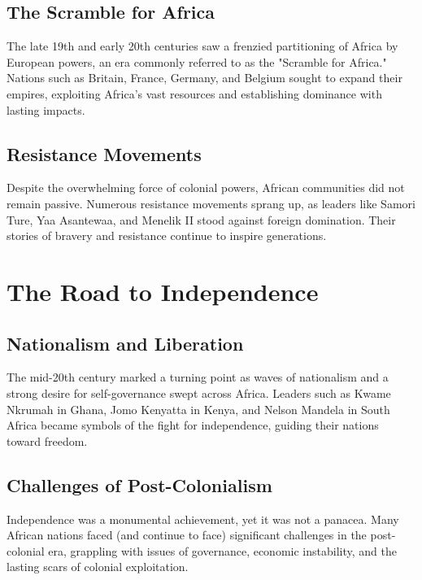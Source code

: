 \documentclass[a4paper,12pt]{book}
\begin{document}
\subsection{The Scramble for Africa}
\label{subsec:scramble-for-africa}

The late 19th and early 20th centuries saw a frenzied partitioning of Africa by European powers, an era commonly referred to as the "Scramble for Africa." Nations such as Britain, France, Germany, and Belgium sought to expand their empires, exploiting Africa’s vast resources and establishing dominance with lasting impacts.

\subsection{Resistance Movements}
\label{subsec:resistance-movements}

Despite the overwhelming force of colonial powers, African communities did not remain passive. Numerous resistance movements sprang up, as leaders like Samori Ture, Yaa Asantewaa, and Menelik II stood against foreign domination. Their stories of bravery and resistance continue to inspire generations.

\section{The Road to Independence}
\label{sec:road-to-independence}

\subsection{Nationalism and Liberation}
\label{subsec:nationalism-and-liberation}

The mid-20th century marked a turning point as waves of nationalism and a strong desire for self-governance swept across Africa. Leaders such as Kwame Nkrumah in Ghana, Jomo Kenyatta in Kenya, and Nelson Mandela in South Africa became symbols of the fight for independence, guiding their nations toward freedom.

\subsection{Challenges of Post-Colonialism}
\label{subsec:challenges-of-post-colonialism}

Independence was a monumental achievement, yet it was not a panacea. Many African nations faced (and continue to face) significant challenges in the post-colonial era, grappling with issues of governance, economic instability, and the lasting scars of colonial exploitation.
\end{document}
